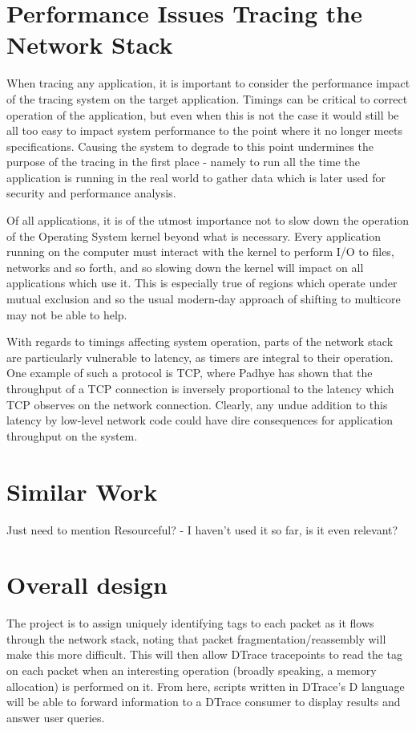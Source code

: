 \documentclass[a4paper,12pt,twoside,openright]{report}
\begin{document}
	\section{Performance Issues Tracing the Network Stack}
	
	When tracing any application, it is important to consider the performance impact of the tracing system on the target application. Timings can be critical to correct operation of the application, but even when this is not the case it would still be all too easy to impact system performance to the point where it no longer meets specifications. Causing the system to degrade to this point undermines the purpose of the tracing in the first place - namely to run all the time the application is running in the real world to gather data which is later used for security and performance analysis.
	
	Of all applications, it is of the utmost importance not to slow down the operation of the Operating System kernel beyond what is necessary. Every application running on the computer must interact with the kernel to perform I/O to files, networks and so forth, and so slowing down the kernel will impact on all applications which use it. This is especially true of regions which operate under mutual exclusion and so the usual modern-day approach of shifting to multicore may not be able to help.
	
	With regards to timings affecting system operation, parts of the network stack are particularly vulnerable to latency, as timers are integral to their operation. One example of such a protocol is TCP, where Padhye\cite{Padhye-TCP} has shown that the throughput of a TCP connection is inversely proportional to the latency which TCP observes on the network connection. Clearly, any undue addition to this latency by low-level network code could have dire consequences for application throughput on the system.
	
	\section{Similar Work}
	
	Just need to mention Resourceful? - I haven't used it so far, is it even relevant?
	
	\section{Overall design}
	
	The project is to assign uniquely identifying tags to each packet as it flows through the network stack, noting that packet fragmentation/reassembly will make this more difficult. This will then allow DTrace tracepoints to read the tag on each packet when an interesting operation (broadly speaking, a memory allocation) is performed on it. From here, scripts written in DTrace's D language will be able to forward information to a DTrace consumer to display results and answer user queries.
\end{document}

